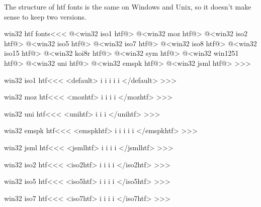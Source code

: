 \documentclass{article}
\begin{document}
The structure of htf fonts is the same on Windows and Unix, so it
doesn't make sense to keep two versions.



\<win32 htf fonts\><<<
@<win32 iso1 htf@>
@<win32 moz htf@>
@<win32 iso2 htf@>
@<win32 iso5 htf@>
@<win32 iso7 htf@>
@<win32 iso8 htf@>
@<win32 iso15 htf@>
@<win32 koi8r htf@>
@<win32 sym htf@>
@<win32 win1251 htf@>
@<win32 uni htf@>
@<win32 emspk htf@>
@<win32 jsml htf@>
>>>



\<win32 iso1 htf\><<<
<default>
i%
i%
i%
i%
i%
</default>
>>>


\<win32 moz htf\><<<
<mozhtf>
i%
i%
i%
i%
</mozhtf>
>>>



\<win32 uni htf\><<<
<unihtf>
i%
i%
i%
</unihtf>
>>>



\<win32 emspk htf\><<<
<emspkhtf>
i%
i%
i%
i%
i%
</emspkhtf>
>>>


\<win32 jsml htf\><<<
<jsmlhtf>
i%
i%
i%
i%
</jsmlhtf>
>>>


\<win32 iso2 htf\><<<
<iso2htf>
i%
i%
i%
i%
</iso2htf>
>>>


\<win32 iso5 htf\><<<
<iso5htf>
i%
i%
i%
i%
</iso5htf>
>>>



\<win32 iso7 htf\><<<
<iso7htf>
i%
i%
i%
i%
</iso7htf>
>>>
\end{document}
